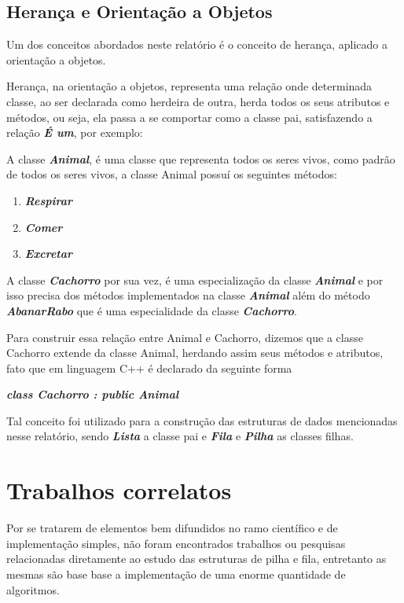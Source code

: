 \documentclass[rascunho,xindy,sublist]{fei}
\begin{document}
\section{Herança e Orientação a Objetos}

Um dos conceitos abordados neste relatório é o conceito de herança, aplicado a orientação a objetos.

Herança, na orientação a objetos, representa uma relação onde determinada classe, ao ser declarada como herdeira de outra, herda todos os seus atributos e métodos, ou seja, ela passa a se comportar como a classe pai, satisfazendo a relação \textbf{\textit{É um}}, por exemplo:

A classe  \textbf{\textit{Animal}}, é uma classe que representa todos os seres vivos, como padrão de todos os seres vivos, a classe Animal possuí os seguintes métodos:

\begin{enumerate}
  \item \textbf{\textit{Respirar}} 
  \item \textbf{\textit{Comer}}
  \item \textbf{\textit{Excretar}}
\end{enumerate}

A classe \textbf{\textit{Cachorro}} por sua vez, é uma especialização da classe  \textbf{\textit{Animal}} e por isso precisa dos métodos implementados na classe  \textbf{\textit{Animal}} além do método  \textbf{\textit{AbanarRabo}} que é uma especialidade da classe \textbf{\textit{Cachorro}}.

Para construir essa relação entre Animal e Cachorro, dizemos que a classe Cachorro extende da classe Animal, herdando assim seus métodos e atributos, fato que em linguagem C++ é declarado da seguinte forma

\textbf{\textit{class Cachorro : public Animal}}

Tal conceito foi utilizado para a construção das estruturas de dados mencionadas nesse relatório, sendo \textbf{\textit{Lista}} a classe pai e \textbf{\textit{Fila}} e \textbf{\textit{Pilha}} as classes filhas.

\chapter{Trabalhos correlatos}

Por se tratarem de elementos bem difundidos no ramo científico e de implementação simples, não foram encontrados trabalhos ou pesquisas relacionadas diretamente ao estudo das estruturas de pilha e fila, entretanto as mesmas são base base a implementação de uma enorme quantidade de algoritmos.
\end{document}
